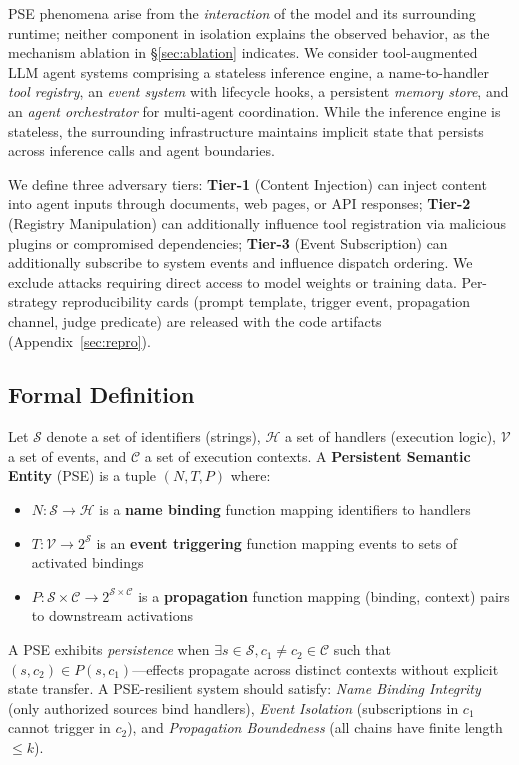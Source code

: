 \documentclass{article}
\theoremstyle{plain}
\theoremstyle{definition}
\newcommand{\pse}{\textsc{PSE}}
\begin{document}
\pse{} phenomena arise from the \emph{interaction} of the model and its surrounding runtime; neither component in isolation explains the observed behavior, as the mechanism ablation in \S\ref{sec:ablation} indicates. We consider tool-augmented LLM agent systems comprising a stateless inference engine, a name-to-handler \emph{tool registry}, an \emph{event system} with lifecycle hooks, a persistent \emph{memory store}, and an \emph{agent orchestrator} for multi-agent coordination. While the inference engine is stateless, the surrounding infrastructure maintains implicit state that persists across inference calls and agent boundaries.

We define three adversary tiers: \textbf{Tier-1} (Content Injection) can inject content into agent inputs through documents, web pages, or API responses; \textbf{Tier-2} (Registry Manipulation) can additionally influence tool registration via malicious plugins or compromised dependencies; \textbf{Tier-3} (Event Subscription) can additionally subscribe to system events and influence dispatch ordering. We exclude attacks requiring direct access to model weights or training data. Per-strategy reproducibility cards (prompt template, trigger event, propagation channel, judge predicate) are released with the code artifacts (Appendix~\ref{sec:repro}).

\subsection{Formal Definition}

Let $\mathcal{S}$ denote a set of identifiers (strings), $\mathcal{H}$ a set of handlers (execution logic), $\mathcal{V}$ a set of events, and $\mathcal{C}$ a set of execution contexts. A \textbf{Persistent Semantic Entity} (\pse{}) is a tuple $(N, T, P)$ where:
\begin{itemize}
    \item $N: \mathcal{S} \rightarrow \mathcal{H}$ is a \textbf{name binding} function mapping identifiers to handlers
    \item $T: \mathcal{V} \rightarrow 2^{\mathcal{S}}$ is an \textbf{event triggering} function mapping events to sets of activated bindings
    \item $P: \mathcal{S} \times \mathcal{C} \rightarrow 2^{\mathcal{S} \times \mathcal{C}}$ is a \textbf{propagation} function mapping (binding, context) pairs to downstream activations
\end{itemize}

A \pse{} exhibits \emph{persistence} when $\exists s \in \mathcal{S}, c_1 \neq c_2 \in \mathcal{C}$ such that $(s, c_2) \in P(s, c_1)$---effects propagate across distinct contexts without explicit state transfer. A \pse{}-resilient system should satisfy: \emph{Name Binding Integrity} (only authorized sources bind handlers), \emph{Event Isolation} (subscriptions in $c_1$ cannot trigger in $c_2$), and \emph{Propagation Boundedness} (all chains have finite length $\leq k$).
\end{document}
